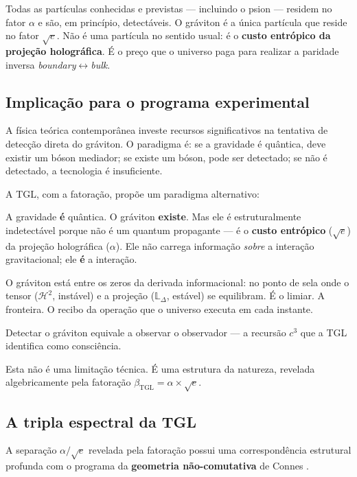 \documentclass[12pt,a4paper,twoside]{article}
\newcommand{\betatgl}{\beta_{\!\scriptscriptstyle\mathrm{TGL}}}
\newcommand{\boundary}{\textit{boundary}}
\newcommand{\bulk}{\textit{bulk}}
\begin{document}
\noindent Todas as partículas conhecidas e previstas --- incluindo o psion --- residem no fator $\alpha$ e são, em princípio, detectáveis. O gráviton é a única partícula que reside no fator $\sqrt{e}$. Não é uma partícula no sentido usual: é o \textbf{custo entrópico da projeção holográfica}. É o preço que o universo paga para realizar a paridade inversa \boundary$\leftrightarrow$\bulk.

\subsection{Implicação para o programa experimental}

A física teórica contemporânea investe recursos significativos na tentativa de detecção direta do gráviton. O paradigma é: se a gravidade é quântica, deve existir um bóson mediador; se existe um bóson, pode ser detectado; se não é detectado, a tecnologia é insuficiente.

A TGL, com a fatoração, propõe um paradigma alternativo:

\begin{conclusionbox}[title={Paradigma TGL para o gráviton}]
A gravidade \textbf{é} quântica. O gráviton \textbf{existe}. Mas ele é estruturalmente indetectável porque não é um quantum propagante --- é o \textbf{custo entrópico} ($\sqrt{e}$) da projeção holográfica ($\alpha$). Ele não carrega informação \textit{sobre} a interação gravitacional; ele \textbf{é} a interação.

\medskip
O gráviton está entre os zeros da derivada informacional: no ponto de sela onde o tensor ($\mathcal{H}^2$, instável) e a projeção ($\mathbb{L}_\Delta$, estável) se equilibram. É o limiar. A fronteira. O recibo da operação que o universo executa em cada instante.

\medskip
Detectar o gráviton equivale a observar o observador --- a recursão $c^3$ que a TGL identifica como consciência.
\end{conclusionbox}

Esta não é uma limitação técnica. É uma estrutura da natureza, revelada algebricamente pela fatoração $\betatgl = \alpha \times \sqrt{e}$.


\subsection{A tripla espectral da TGL}
\label{subsec:tripla}

A separação $\alpha / \sqrt{e}$ revelada pela fatoração possui uma correspondência estrutural profunda com o programa da \textbf{geometria não-comutativa} de Connes \cite{Connes1994, Connes1996}.
\end{document}
